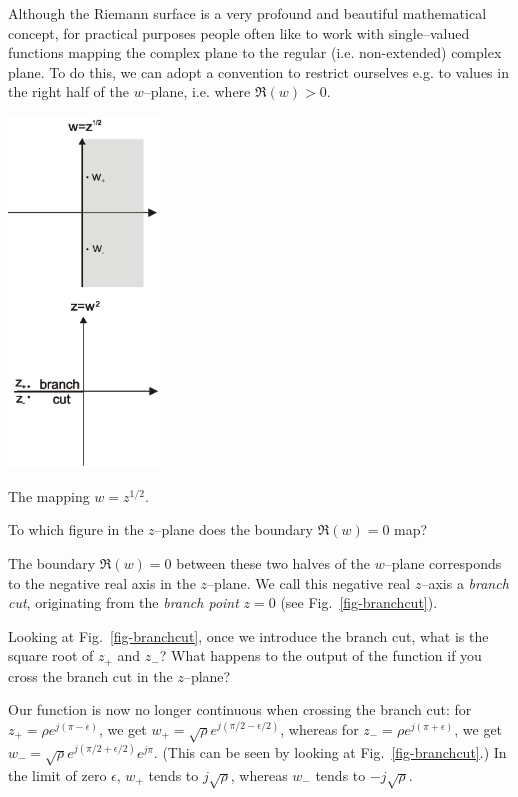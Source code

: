 Although the Riemann surface is a very profound and beautiful mathematical concept, for practical purposes people often like to work with single--valued functions mapping the complex plane to the regular (i.e. non-extended) complex plane. To do this, we can adopt a convention to restrict ourselves e.g. to values in the right half of the $w$--plane, i.e. where $\Re(w)>0$.


\begin{marginfigure}[-1cm]
\centering
\includegraphics[width=4cm]{complex/figures/branchcut_portrait}
\caption{The mapping $w=z^{1/2}$.}
\label{fig-branchcut}
\end{marginfigure}


\begin{cue}
To which figure in the $z$--plane does the boundary $\Re(w)=0$ map?
\end{cue}

The boundary $\Re(w)=0$ between these two halves of the $w$--plane corresponds to the negative real axis in the $z$--plane. We call this negative real $z$--axis a \emph{branch cut}, originating from the \emph{branch point} $z=0$ (see Fig.~\ref{fig-branchcut}).

\begin{cue}
Looking at Fig.~\ref{fig-branchcut}, once we introduce the branch cut, what is the square root of $z_+$ and $z_-$? What happens to the output of the function if you cross the branch cut in the $z$--plane? 
\end{cue}

Our function is now no longer continuous when crossing the branch cut: for $z_+ = \rho e^{j (\pi - \epsilon)}$, we get $w_+ = \sqrt{\rho} e^{j (\pi/2 - \epsilon/2)}$, whereas for $z_- = \rho e^{j (\pi + \epsilon)}$, we get $w_- = \sqrt{\rho} e^{j (\pi/2 + \epsilon/2)} e^{j \pi}$. (This can be seen by looking at Fig.~\ref{fig-branchcut}.) In the limit of zero $\epsilon$, $w_+$ tends to $j\sqrt{\rho}$, whereas $w_-$ tends to $-j\sqrt{\rho}$.

